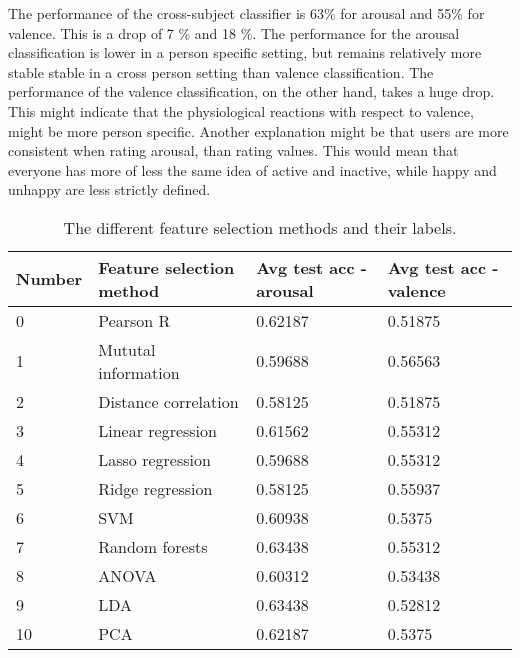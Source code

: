 \npar

The performance of the cross-subject classifier is 63\% for arousal and 55\% for valence. This is a drop of 7 \% and 18 \%. The performance for the arousal classification is lower in a person specific setting, but remains relatively more stable stable in a cross person setting than valence classification. The performance of the valence classification, on the other hand, takes a huge drop. This might indicate that the physiological reactions with respect to valence, might be more person specific. Another explanation might be that users are more consistent when rating arousal, than rating values. This would mean that everyone has more of less the same idea of active and inactive, while happy and unhappy are less strictly defined.

\begin{table}[H]
\centering
\begin{tabular}{llll}
\textbf{Number} & \textbf{Feature selection method} & \textbf{Avg test acc - arousal} & \textbf{Avg test acc - valence} \\ \hline
0               & Pearson R                          & 0.62187                             & 0.51875                             \\
1               & Mututal information                            & 0.59688                             & 0.56563                             \\
2               & Distance correlation                             & 0.58125                             & 0.51875                             \\
3               & Linear regression                                & 0.61562                             & 0.55312                             \\
4               & Lasso regression                                & 0.59688                             & 0.55312                             \\
5               & Ridge regression                                & 0.58125                             & 0.55937                             \\
6               & SVM                & 0.60938                             & 0.5375                              \\
7               & Random forests           & 0.63438                             & 0.55312                             \\
8               & ANOVA                             & 0.60312                             & 0.53438                             \\
9               & LDA                               & 0.63438                             & 0.52812                             \\
10              & PCA                               & 0.62187                             & 0.5375                             
\end{tabular}
\caption{The different feature selection methods and their labels\label{genacctable}.}
\end{table}

